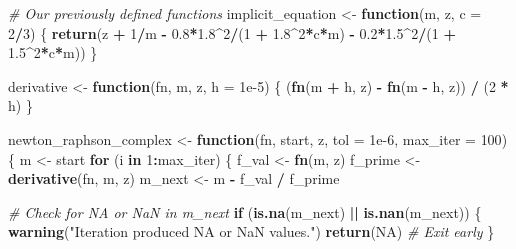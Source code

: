 \documentclass[
]{article}
\newenvironment{Shaded}{\begin{snugshade}}{\end{snugshade}}
\newcommand{\AttributeTok}[1]{\textcolor[rgb]{0.13,0.29,0.53}{#1}}
\newcommand{\CommentTok}[1]{\textcolor[rgb]{0.56,0.35,0.01}{\textit{#1}}}
\newcommand{\ConstantTok}[1]{\textcolor[rgb]{0.56,0.35,0.01}{#1}}
\newcommand{\ControlFlowTok}[1]{\textcolor[rgb]{0.13,0.29,0.53}{\textbf{#1}}}
\newcommand{\DecValTok}[1]{\textcolor[rgb]{0.00,0.00,0.81}{#1}}
\newcommand{\FloatTok}[1]{\textcolor[rgb]{0.00,0.00,0.81}{#1}}
\newcommand{\FunctionTok}[1]{\textcolor[rgb]{0.13,0.29,0.53}{\textbf{#1}}}
\newcommand{\NormalTok}[1]{#1}
\newcommand{\OtherTok}[1]{\textcolor[rgb]{0.56,0.35,0.01}{#1}}
\newcommand{\SpecialCharTok}[1]{\textcolor[rgb]{0.81,0.36,0.00}{\textbf{#1}}}
\newcommand{\StringTok}[1]{\textcolor[rgb]{0.31,0.60,0.02}{#1}}
\begin{document}
\begin{Shaded}
\begin{Highlighting}[]
\CommentTok{\# Our previously defined functions}
\NormalTok{implicit\_equation }\OtherTok{\textless{}{-}} \ControlFlowTok{function}\NormalTok{(m, z, }\AttributeTok{c =} \DecValTok{2}\SpecialCharTok{/}\DecValTok{3}\NormalTok{) \{}
  \FunctionTok{return}\NormalTok{(z }\SpecialCharTok{+} \DecValTok{1}\SpecialCharTok{/}\NormalTok{m }\SpecialCharTok{{-}} \FloatTok{0.8}\SpecialCharTok{*}\FloatTok{1.8}\SpecialCharTok{\^{}}\DecValTok{2}\SpecialCharTok{/}\NormalTok{(}\DecValTok{1} \SpecialCharTok{+} \FloatTok{1.8}\SpecialCharTok{\^{}}\DecValTok{2}\SpecialCharTok{*}\NormalTok{c}\SpecialCharTok{*}\NormalTok{m) }\SpecialCharTok{{-}} \FloatTok{0.2}\SpecialCharTok{*}\FloatTok{1.5}\SpecialCharTok{\^{}}\DecValTok{2}\SpecialCharTok{/}\NormalTok{(}\DecValTok{1} \SpecialCharTok{+} \FloatTok{1.5}\SpecialCharTok{\^{}}\DecValTok{2}\SpecialCharTok{*}\NormalTok{c}\SpecialCharTok{*}\NormalTok{m))}
\NormalTok{\}}

\NormalTok{derivative }\OtherTok{\textless{}{-}} \ControlFlowTok{function}\NormalTok{(fn, m, z, }\AttributeTok{h =} \FloatTok{1e{-}5}\NormalTok{) \{}
\NormalTok{  (}\FunctionTok{fn}\NormalTok{(m }\SpecialCharTok{+}\NormalTok{ h, z) }\SpecialCharTok{{-}} \FunctionTok{fn}\NormalTok{(m }\SpecialCharTok{{-}}\NormalTok{ h, z)) }\SpecialCharTok{/}\NormalTok{ (}\DecValTok{2} \SpecialCharTok{*}\NormalTok{ h)}
\NormalTok{\}}

\NormalTok{newton\_raphson\_complex }\OtherTok{\textless{}{-}} \ControlFlowTok{function}\NormalTok{(fn, start, z, }\AttributeTok{tol =} \FloatTok{1e{-}6}\NormalTok{, }\AttributeTok{max\_iter =} \DecValTok{100}\NormalTok{) \{}
\NormalTok{  m }\OtherTok{\textless{}{-}}\NormalTok{ start}
  \ControlFlowTok{for}\NormalTok{ (i }\ControlFlowTok{in} \DecValTok{1}\SpecialCharTok{:}\NormalTok{max\_iter) \{}
\NormalTok{    f\_val }\OtherTok{\textless{}{-}} \FunctionTok{fn}\NormalTok{(m, z)}
\NormalTok{    f\_prime }\OtherTok{\textless{}{-}} \FunctionTok{derivative}\NormalTok{(fn, m, z)}
\NormalTok{    m\_next }\OtherTok{\textless{}{-}}\NormalTok{ m }\SpecialCharTok{{-}}\NormalTok{ f\_val }\SpecialCharTok{/}\NormalTok{ f\_prime}
    
    \CommentTok{\# Check for NA or NaN in m\_next}
    \ControlFlowTok{if}\NormalTok{ (}\FunctionTok{is.na}\NormalTok{(m\_next) }\SpecialCharTok{||} \FunctionTok{is.nan}\NormalTok{(m\_next)) \{}
      \FunctionTok{warning}\NormalTok{(}\StringTok{"Iteration produced NA or NaN values."}\NormalTok{)}
      \FunctionTok{return}\NormalTok{(}\ConstantTok{NA}\NormalTok{)  }\CommentTok{\# Exit early}
\NormalTok{    \}}
    

\end{Highlighting}
\end{Shaded}
\end{document}
